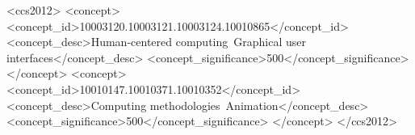 
\begin{CCSXML}
<ccs2012>
   <concept>
       <concept_id>10003120.10003121.10003124.10010865</concept_id>
       <concept_desc>Human-centered computing~Graphical user interfaces</concept_desc>
       <concept_significance>500</concept_significance>
       </concept>
   <concept>
       <concept_id>10010147.10010371.10010352</concept_id>
       <concept_desc>Computing methodologies~Animation</concept_desc>
       <concept_significance>500</concept_significance>
       </concept>
 </ccs2012>
\end{CCSXML}



